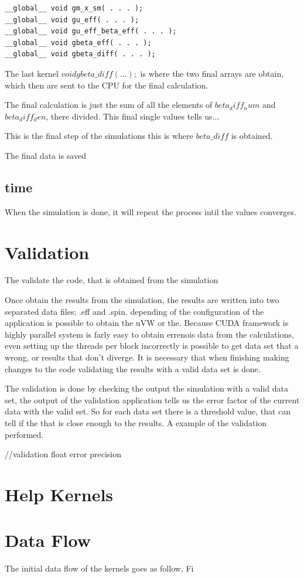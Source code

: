 \begin{lstlisting}[frame=none]
__global__ void gm_x_sm( . . . );
__global__ void gu_eff( . . . );
__global__ void gu_eff_beta_eff( . . . );
__global__ void gbeta_eff( . . . );
__global__ void gbeta_diff( . . . );
\end{lstlisting}

The last kernel $ void gbeta\_diff( . . . );$ is where the two final arrays are obtain,
which then are sent to the CPU for the final calculation.

The final calculation is just the sum of all the elements of $beta_diff_num$ and $beta_diff_den$, there divided.
This final single values tells us...


This is the final step of the simulations this is where $beta\_diff$ is obtained.

The final data is saved
\subsection{time}

When the simulation is done, it will repeat the process intil the values converges.


\section{Validation}

The validate the code, that is obtained from the simulation

Once obtain the results from the simulation, the results are written into two separated data files; .eff and .spin. depending of the configuration of the application is possible to obtain the uVW or the. Because CUDA framework is highly parallel system is farly easy to obtain errenois data from the calculations, even setting up the threads per block incorrectly is possible to get data set that a wrong, or results that don't diverge. It is necessary that when finishing making changes to the code validating the results with a valid data set is done.

The validation is done by checking the output the simulation with a valid data set, the output of the validation application tells us the error factor of the current data with the valid set. So for each data set there is a threshold value, that can tell if the that is close enough to the results. A example of the validation performed.

//validation float error precision


\section{Help Kernels}



\section{Data Flow}


The initial data flow of the kernels goes as follow, Fi
